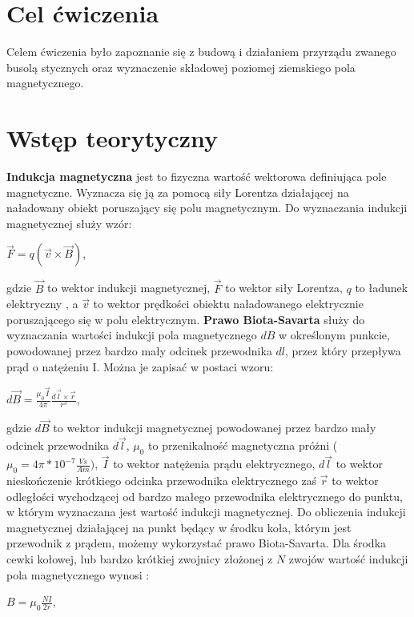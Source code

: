 \documentclass[12pt]{article}
\begin{document}
\tableofcontents \newpage
\section{Cel ćwiczenia}
Celem ćwiczenia było zapoznanie się z budową i działaniem przyrządu zwanego busolą stycznych oraz wyznaczenie składowej poziomej ziemskiego pola magnetycznego.
\section{Wstęp teorytyczny}
\textbf{Indukcja magnetyczna} jest to fizyczna wartość wektorowa definiująca pole magnetyczne. Wyznacza się ją za pomocą siły Lorentza działającej na naładowany obiekt poruszający się polu magnetycznym. Do wyznaczania indukcji magnetycznej służy wzór: 
\begin{center}
\Large $\vec{F}=q(\vec{v}\times\vec{B}) $,
\end{center}
gdzie $\vec{B}$ to wektor indukcji magnetycznej, $\vec{F}$ to wektor siły Lorentza, $q$ to ładunek elektryczny , a $\vec{v}$ to wektor prędkości obiektu naładowanego elektrycznie poruszającego się w polu elektrycznym. \newline
\textbf{Prawo Biota-Savarta} służy do wyznaczania wartości indukcji pola magnetycznego $dB$ w określonym punkcie, powodowanej przez bardzo mały odcinek przewodnika $dl$, przez który przepływa prąd o natężeniu I. Można je zapisać w postaci wzoru: 
\begin{center}
\Large $ d\vec{B}=\frac{\mu_0\vec{I}}{4\pi}\frac{d\vec{l}{\times}\vec{r}}{r^3}$,
\end{center}
gdzie $d\vec{B}$ to wektor indukcji magnetycznej powodowanej przez bardzo mały odcinek przewodnika $d\vec{l}$, $\mu_0$ to przenikalność magnetyczna próżni ($\mu_0=4\pi*10^{-7}\frac{Vs}{Am})$, $\vec{I}$ to wektor natężenia prądu elektrycznego, $d\vec{l}$ to wektor nieskończenie krótkiego odcinka przewodnika elektrycznego zaś $\vec{r}$ to wektor odległości wychodzącej od bardzo małego przewodnika elektrycznego do punktu, w którym wyznaczana jest wartość indukcji magnetycznej. \newline
Do obliczenia indukcji magnetycznej działającej na punkt będący w środku koła, którym jest przewodnik z prądem, możemy wykorzystać prawo Biota-Savarta. Dla środka cewki kołowej, lub bardzo krótkiej zwojnicy złożonej z $N$ zwojów wartość indukcji pola magnetycznego wynosi : 
\begin{center}
\Large $ B = \mu_0\frac{NI}{2r}$,
\end{center}
\end{document}
